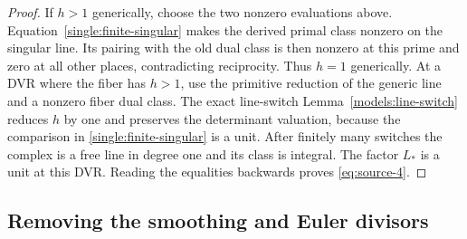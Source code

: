 \begin{proof}
If \(h>1\) generically, choose the two nonzero evaluations above.
Equation~\eqref{single:finite-singular} makes the derived primal
class nonzero on the singular line.  Its pairing with the old
dual class is then nonzero at this prime and zero at all other
places, contradicting reciprocity.  Thus \(h=1\) generically.
At a DVR where the fiber has \(h>1\), use the primitive reduction
of the generic line and a nonzero fiber dual class.  The exact
line-switch Lemma~\ref{models:line-switch} reduces \(h\) by one
and preserves the determinant valuation, because the comparison in
\eqref{single:finite-singular} is a unit.  After finitely many
switches the complex is a free line in degree one and its class
is integral.  The factor \(L_*\) is a unit at this DVR.  Reading
the equalities backwards proves \eqref{eq:source-4}.
\end{proof}

\subsection{Removing the smoothing and Euler divisors}

